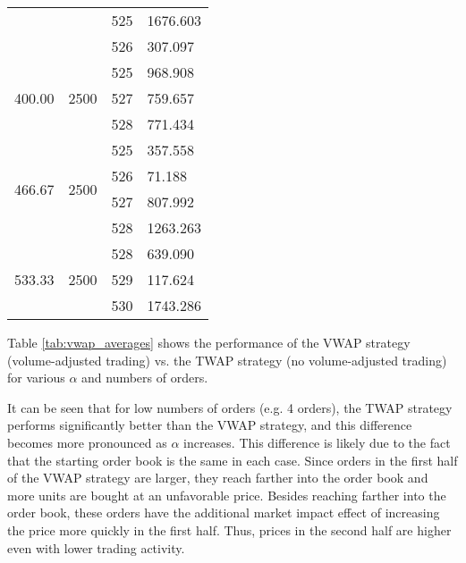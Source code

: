 \begin{table}[htbp]
\begin{center}
\begin{tabular}{l|l|l|l}
                        &                       & 525 & 1676.603 \\
                        &                       & 526 & 307.097  \\
\hline
\multirow{3}{*}{400.00} & \multirow{3}{*}{2500} & 525 & 968.908  \\
                        &                       & 527 & 759.657  \\
                        &                       & 528 & 771.434  \\
\hline
\multirow{4}{*}{466.67} & \multirow{4}{*}{2500} & 525 & 357.558  \\
                        &                       & 526 & 71.188   \\
                        &                       & 527 & 807.992  \\
                        &                       & 528 & 1263.263 \\
\hline
\multirow{3}{*}{533.33} & \multirow{3}{*}{2500} & 528 & 639.090  \\
                        &                       & 529 & 117.624  \\
                        &                       & 530 & 1743.286
\end{tabular}
\end{center}
\end{table}

Table \ref{tab:vwap_averages} shows the performance of the VWAP strategy (volume-adjusted trading) vs. the TWAP strategy (no volume-adjusted trading) for various $\alpha$ and numbers of orders. 

It can be seen that for low numbers of orders (e.g. 4 orders), the TWAP strategy performs significantly better than the VWAP strategy, and this difference becomes more pronounced as $\alpha$ increases. This difference is likely due to the fact that the starting order book is the same in each case. Since orders in the first half of the VWAP strategy are larger, they reach farther into the order book and more units are bought at an unfavorable price. Besides reaching farther into the order book, these orders have the additional market impact effect of increasing the price more quickly in the first half. Thus, prices in the second half are higher even with lower trading activity.

